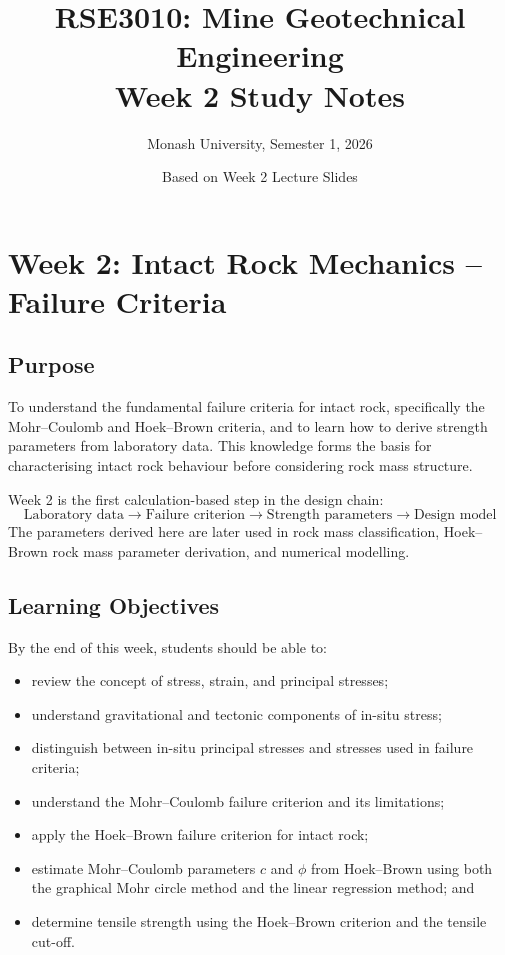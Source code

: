 \documentclass[a4paper,12pt]{article}
\title{\textbf{RSE3010: Mine Geotechnical Engineering}\\Week 2 Study Notes}
\author{Monash University, Semester 1, 2026}
\date{Based on Week 2 Lecture Slides}
\begin{document}
\maketitle

\section{Week 2: Intact Rock Mechanics -- Failure Criteria}

\subsection{Purpose}

To understand the fundamental failure criteria for intact rock, specifically the
Mohr--Coulomb and Hoek--Brown criteria, and to learn how to derive strength parameters
from laboratory data. This knowledge forms the basis for characterising intact rock
behaviour before considering rock mass structure.

\begin{keybox}
Week 2 is the first calculation-based step in the design chain:
\[
\text{Laboratory data} \rightarrow \text{Failure criterion} \rightarrow
\text{Strength parameters} \rightarrow \text{Design model}
\]
The parameters derived here are later used in rock mass classification, Hoek--Brown rock
mass parameter derivation, and numerical modelling.
\end{keybox}

\subsection{Learning Objectives}

By the end of this week, students should be able to:
\begin{itemize}
    \item review the concept of stress, strain, and principal stresses;
    \item understand gravitational and tectonic components of in-situ stress;
    \item distinguish between in-situ principal stresses and stresses used in failure criteria;
    \item understand the Mohr--Coulomb failure criterion and its limitations;
    \item apply the Hoek--Brown failure criterion for intact rock;
    \item estimate Mohr--Coulomb parameters \(c\) and \(\phi\) from Hoek--Brown using
    both the graphical Mohr circle method and the linear regression method; and
    \item determine tensile strength using the Hoek--Brown criterion and the tensile cut-off.
\end{itemize}
\end{document}
